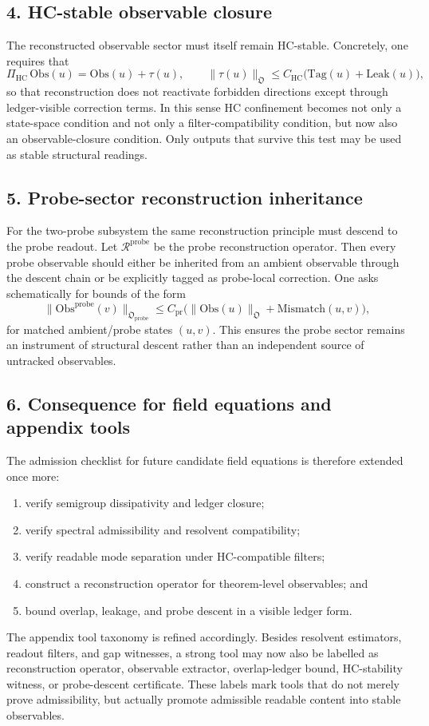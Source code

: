 \subsection*{4. HC-stable observable closure}
The reconstructed observable sector must itself remain HC-stable. Concretely, one
requires that
\[
\Pi_{\mathrm{HC}}\,\mathrm{Obs}(u)=\mathrm{Obs}(u)+\tau(u),
\qquad
\|\tau(u)\|_{\mathfrak O}\le C_{\mathrm{HC}}
\bigl(\mathrm{Tag}(u)+\mathrm{Leak}(u)\bigr),
\]
so that reconstruction does not reactivate forbidden directions except through
ledger-visible correction terms. In this sense HC confinement becomes not only a
state-space condition and not only a filter-compatibility condition, but now also an
observable-closure condition. Only outputs that survive this test may be used as
stable structural readings.

\subsection*{5. Probe-sector reconstruction inheritance}
For the two-probe subsystem the same reconstruction principle must descend to the
probe readout. Let $\mathcal R^{\mathrm{probe}}$ be the probe reconstruction operator.
Then every probe observable should either be inherited from an ambient observable
through the descent chain or be explicitly tagged as probe-local correction. One
asks schematically for bounds of the form
\[
\|\mathrm{Obs}^{\mathrm{probe}}(v)\|_{\mathfrak O_{\mathrm{probe}}}
\le C_{\mathrm{pr}}
\bigl(
\|\mathrm{Obs}(u)\|_{\mathfrak O}
+\mathrm{Mismatch}(u,v)
\bigr),
\]
for matched ambient/probe states $(u,v)$. This ensures the probe sector remains an
instrument of structural descent rather than an independent source of untracked
observables.

\subsection*{6. Consequence for field equations and appendix tools}
The admission checklist for future candidate field equations is therefore extended
once more:
\begin{enumerate}[label=(\arabic*)]
  \item verify semigroup dissipativity and ledger closure;
  \item verify spectral admissibility and resolvent compatibility;
  \item verify readable mode separation under HC-compatible filters;
  \item construct a reconstruction operator for theorem-level observables; and
  \item bound overlap, leakage, and probe descent in a visible ledger form.
\end{enumerate}
The appendix tool taxonomy is refined accordingly. Besides resolvent estimators,
readout filters, and gap witnesses, a strong tool may now also be labelled as
reconstruction operator, observable extractor, overlap-ledger bound, HC-stability
witness, or probe-descent certificate. These labels mark tools that do not merely
prove admissibility, but actually promote admissible readable content into stable
observables.

